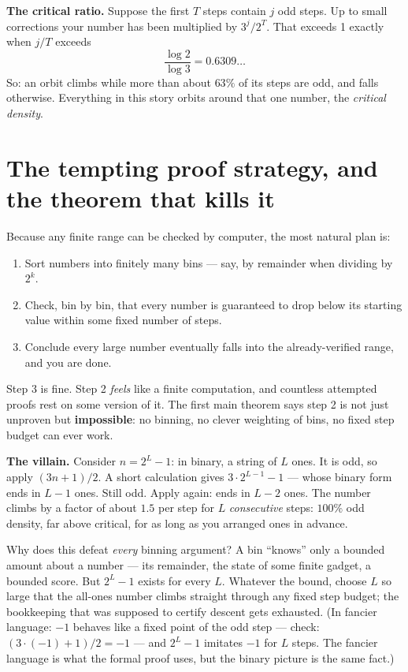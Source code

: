 \documentclass[11pt]{article}
\begin{document}
\begin{keyidea}
\textbf{The critical ratio.} Suppose the first $T$ steps contain $j$ odd
steps. Up to small corrections your number has been multiplied by
$3^j / 2^T$. That exceeds 1 exactly when $j/T$ exceeds
\[
\frac{\log 2}{\log 3} = 0.6309\ldots
\]
So: an orbit climbs while more than about $63\%$ of its steps are odd,
and falls otherwise. Everything in this story orbits around that one
number, the \emph{critical density}.
\end{keyidea}

\section{The tempting proof strategy, and the theorem that kills it}

Because any finite range can be checked by computer, the most natural
plan is:
\begin{enumerate}
\item Sort numbers into finitely many bins --- say, by remainder when
dividing by $2^k$.
\item Check, bin by bin, that every number is guaranteed to drop below
its starting value within some fixed number of steps.
\item Conclude every large number eventually falls into the
already-verified range, and you are done.
\end{enumerate}
Step 3 is fine. Step 2 \emph{feels} like a finite computation, and
countless attempted proofs rest on some version of it. The first main theorem says step 2 is not just unproven
but \textbf{impossible}: no binning, no clever weighting of bins, no
fixed step budget can ever work.

\textbf{The villain.} Consider $n = 2^L - 1$: in binary, a string of
$L$ ones. It is odd, so apply $(3n+1)/2$. A short calculation gives
$3 \cdot 2^{L-1} - 1$ --- whose binary form ends in $L-1$ ones. Still
odd. Apply again: ends in $L-2$ ones. The number climbs by a factor of
about $1.5$ per step for $L$ \emph{consecutive} steps: $100\%$ odd
density, far above critical, for as long as you arranged ones in
advance.

Why does this defeat \emph{every} binning argument? A bin ``knows''
only a bounded amount about a number --- its remainder, the state of
some finite gadget, a bounded score. But $2^L - 1$ exists for every
$L$. Whatever the bound, choose $L$ so large that the all-ones number
climbs straight through any fixed step budget; the bookkeeping that
was supposed to certify descent gets exhausted. (In fancier language:
$-1$ behaves like a fixed point of the odd step --- check:
$(3 \cdot (-1) + 1)/2 = -1$ --- and $2^L - 1$ imitates $-1$ for $L$
steps. The fancier language is what the formal proof uses, but the
binary picture is the same fact.)
\end{document}
